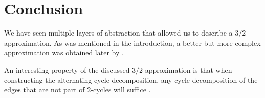 \documentclass[11pt,DIV=11]{scrartcl}
\theoremstyle{definition}
\theoremstyle{remark}
\begin{document}
\section{Conclusion}
\label{sec:conclusion}

We have seen multiple layers of abstraction that allowed us to describe a $3/2$-approximation. As was mentioned in the introduction, a better but more complex approximation was obtained later by \citeauthor*{Berman2001}.

An interesting property of the discussed $3/2$-approximation is that when constructing the alternating cycle decomposition, any cycle decomposition of the edges that are not part of $2$-cycles will suffice \cite{Christie1998}.

\printbibliography
\end{document}
